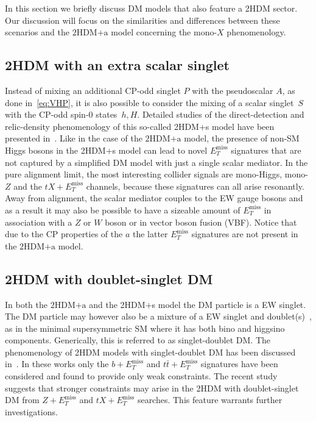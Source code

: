\documentclass[a4paper, 11pt,notoc]{article}
\newcommand{\MET}{\ensuremath{E_T^\mathrm{miss}}\xspace}
\newcommand{\hdma}{\ensuremath{\textrm{2HDM+a}}\xspace}
\begin{document}
In this section we briefly discuss DM models that also feature a 2HDM sector. {\color{blue} Our discussion will focus on the similarities and differences  between these scenarios and the \hdma model  concerning the mono-$X$ phenomenology. }

\subsection*{2HDM with an extra scalar singlet}

Instead of mixing an additional CP-odd singlet $P$ with the pseudoscalar $A$, as done in~\eqref{eq:VHP}, it is also possible to consider the mixing of a  scalar singlet~$S$ with  the CP-odd spin-0 states~$h,H$. Detailed studies of the direct-detection and relic-density phenomenology of this so-called 2HDM+s model have been presented in~\cite{Bell:2016ekl,Bell:2017rgi}.  Like in the case of the \hdma model, the presence of  non-SM Higgs bosons in the 2HDM+s model can lead to novel $\MET$ signatures that are not captured by a simplified DM model with just a single scalar mediator. In the pure alignment limit, the most interesting collider signals are mono-Higgs, mono-$Z$ and the $t X + \MET$  channels, because  these signatures can all arise resonantly. Away from alignment, the scalar mediator couples to the EW gauge bosons and as a result it may also be possible to have a sizeable amount of $\MET$ in association with a $Z$ or $W$ boson or in  vector boson fusion (VBF). Notice that due to the CP properties of the $a$ the latter $\MET$ signatures are not present in the \hdma model. 

\subsection*{2HDM with doublet-singlet DM}

In both the \hdma and the 2HDM+s model the DM particle is  a EW singlet. The DM particle may however also be a mixture of a EW singlet and doublet(s)~\cite{Mahbubani:2005pt,Enberg:2007rp,Cohen:2011ec,Cheung:2013dua}, as in the minimal {\color{green} supersymmetric} SM where it has both bino and higgsino components. Generically, this is referred to as singlet-doublet DM. The phenomenology of 2HDM models with singlet-doublet DM has been discussed in~\cite{Berlin:2015wwa,Arcadi:2018pfo}. In these works only the $b+\MET$ and $t \bar t+\MET$ signatures have been considered and found to provide only weak constraints. The recent study~\cite{Bauer:2017fsw} suggests that stronger constraints may  arise in the 2HDM with doublet-singlet DM from $Z + \MET$ and $tX+\MET$ searches. This feature warrants further investigations. 
\end{document}
